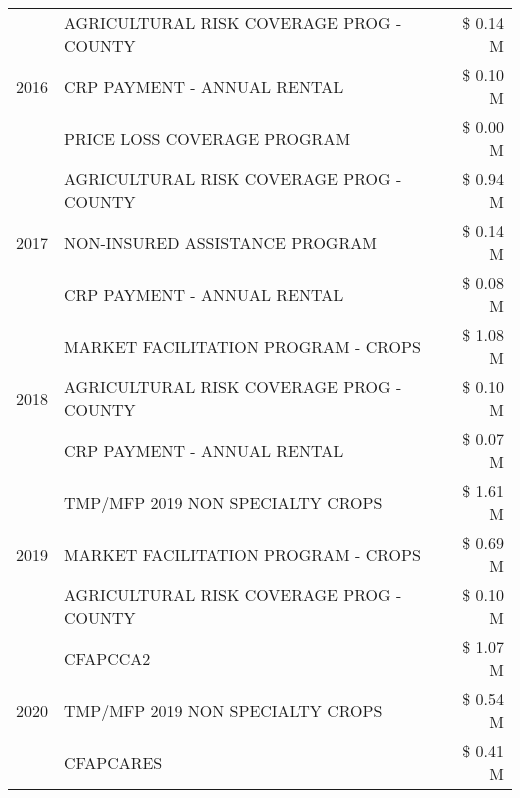 \begin{tabular}{llr}
\cline{1-3}
\multirow[t]{3}{*}{2016} & AGRICULTURAL RISK COVERAGE PROG - COUNTY & \$ 0.14 M \\
 & CRP PAYMENT - ANNUAL RENTAL & \$ 0.10 M \\
 & PRICE LOSS COVERAGE PROGRAM & \$ 0.00 M \\
\cline{1-3}
\multirow[t]{3}{*}{2017} & AGRICULTURAL RISK COVERAGE PROG - COUNTY & \$ 0.94 M \\
 & NON-INSURED ASSISTANCE PROGRAM & \$ 0.14 M \\
 & CRP PAYMENT - ANNUAL RENTAL & \$ 0.08 M \\
\cline{1-3}
\multirow[t]{3}{*}{2018} & MARKET FACILITATION PROGRAM - CROPS & \$ 1.08 M \\
 & AGRICULTURAL RISK COVERAGE PROG - COUNTY & \$ 0.10 M \\
 & CRP PAYMENT - ANNUAL RENTAL & \$ 0.07 M \\
\cline{1-3}
\multirow[t]{3}{*}{2019} & TMP/MFP 2019 NON SPECIALTY CROPS & \$ 1.61 M \\
 & MARKET FACILITATION PROGRAM - CROPS & \$ 0.69 M \\
 & AGRICULTURAL RISK COVERAGE PROG - COUNTY & \$ 0.10 M \\
\cline{1-3}
\multirow[t]{3}{*}{2020} & CFAPCCA2 & \$ 1.07 M \\
 & TMP/MFP 2019 NON SPECIALTY CROPS & \$ 0.54 M \\
 & CFAPCARES & \$ 0.41 M \\
\cline{1-3}
\bottomrule
\end{tabular}
